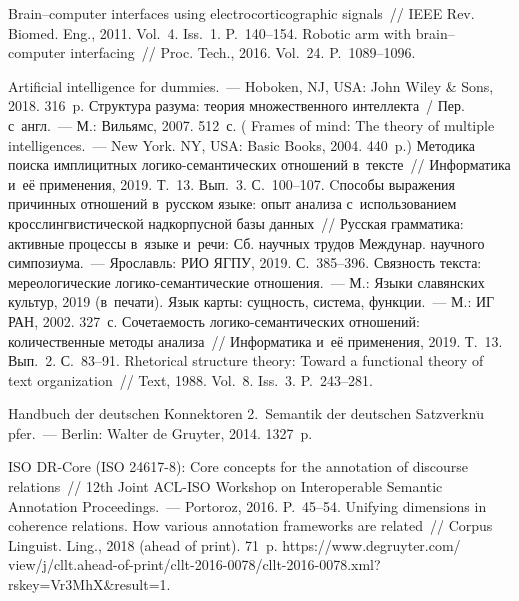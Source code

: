 \begin{multicols}{2}
{{\begin{thebibliography}{99}
 Brain--computer interfaces using electrocorticographic signals~// 
IEEE Rev. Biomed. Eng., 2011. Vol.~4. Iss.~1. P.~140--154.
 Robotic 
arm with brain--computer interfacing~// Proc. Tech., 2016. Vol.~24. P.~1089--1096.

 Artificial intelligence for dummies.~--- Hoboken,
NJ, USA: John Wiley \& 
Sons, 2018. 316~p. 
 Структура разума: теория множественного интеллекта~/ Пер. с~англ.~--- М.: 
Вильямс, 2007. 512~с. ( Frames of mind: The theory of multiple  
intelligences.~--- New York. NY, USA: Basic Books, 2004. 440~p.)
 Методика поиска имплицитных логико-семантических 
отношений в~тексте~// Информатика и~её применения, 2019. Т.~13. Вып.~3. С.~100--107.
 Cпособы выражения причинных отношений в~русском 
языке: опыт анализа с~использованием кросслингвистической надкорпусной базы данных~// 
Русская грамматика: активные процессы в~языке и~речи: Сб. научных трудов Междунар. 
научного симпозиума.~--- Ярославль: РИО ЯГПУ, 2019. С.~385--396.
 Связность текста: мереологические  
ло\-ги\-ко-се\-ман\-ти\-че\-ские отношения.~--- М.: Языки славянских культур, 2019 
(в~печати).
 Язык карты: сущность, система, функции.~--- М.: ИГ РАН, 2002. 327~с.
 Сочетаемость логико-се\-ман\-ти\-че\-ских отношений: 
количественные методы анализа~// Информатика и~её применения, 2019. Т.~13. Вып.~2. 
С.~83--91.
 Rhetorical structure theory: Toward a functional theory of text 
organization~// Text,
1988. Vol.~8. Iss.~3. P.~243--281.

 Handbuch der deutschen 
Konnektoren 2.~Semantik der deutschen Satzverkn$\ddot{\mbox{u}}$pfer.~--- Berlin: Walter de 
Gruyter, 2014. 1327~p.

 ISO DR-Core (ISO 24617-8): Core concepts for the annotation of discourse relations~// 12th Joint 
ACL-ISO Workshop on Interoperable Semantic Annotation Proceedings.~--- Portoroz, 2016.  
P.~45--54.
 Unifying dimensions in coherence relations. How various annotation 
frameworks are related~// Corpus Linguist. Ling., 2018 (ahead of print).  
71~p. {\sf 
https://www.degruyter.com/ view/j/cllt.ahead-of-print/cllt-2016-0078/cllt-2016-0078.xml?rskey=Vr3MhX\&result=1}.


\end{thebibliography}}}
\end{multicols}
